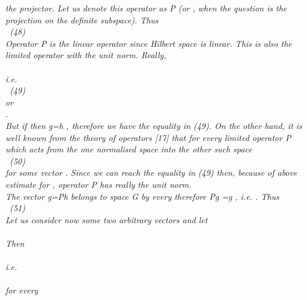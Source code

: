 \documentclass[a4paper,12pt] {article}
\begin{document}
{ \it the projector. \rm  Let us denote this  operator as P (or \coordHE{} , \coordHE{} when the question is the
projection on the definite subspace). Thus \\\coordHE{}  \ (48)
\\ Operator P is  \it  the linear  operator \rm  since Hilbert space is linear. This is also the  \it  limited \rm
operator with the \it unit \rm  norm. Really, \\\coordHE{} \\i.e. \\ \coordHE{} \ (49)
 \\ or \\ \coordHE{} .
\\ But if  \coordHE{}  then g=h , therefore we have the   \it equality \rm in (49). On the other hand, it is well
 known from the theory of operators [17] that  \it  for every limited operator \rm P \it  which acts from the
 one normalised space into the other such space
 \\\coordHE{} \ \rm (50) \\
 for some vector \coordHE{}. Since we can reach the equality  in (49) then, because of above estimate for
  \coordHE{} , operator P has really the unit norm.\\ The  vector g=Ph belongs to space
G by every  \coordHE{}  therefore Pg =g , i.e. \coordHE{}. Thus \\\coordHE{} \ (51)\\ Let us consider now
some two  arbitrary vectors \coordHE{} and let \\\coordHE{}  \\Then \\
 \coordHE{} \\ i.e. \\ \coordHE{}\\ for every }
\end{document}
